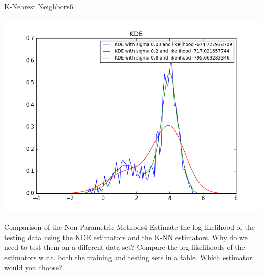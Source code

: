 \begin{questions}
\begin{question}{K-Nearest Neighbors}{6}
\begin{answer}
	
		\centering \includegraphics[width=0.6\linewidth]{dataSets/2-3-b}\label{fig:kde}
		
		
		
\end{answer}

\end{question}


\begin{question}{Comparison of the Non-Parametric Methods}{4}
Estimate the log-likelihood of the testing data using the KDE estimators and the K-NN estimators.
Why do we need to test them on a different data set? Compare the log-likelihoods of the estimators w.r.t. both the training and testing sets in a table. Which estimator would you choose?

\begin{answer}
\end{answer}

\end{question}

\end{questions}

